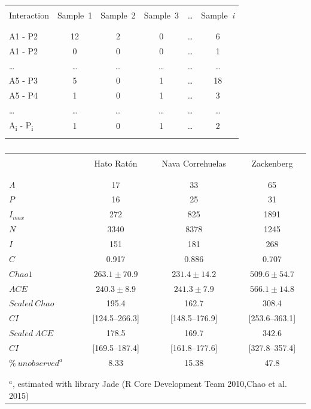 \documentclass[12pt]{article}
\begin{document}
%
\newpage
\begin{table}[h!]
  \caption{}
  \label{TabENFA}
  \begin{center}
    \begin{tabular}{lccccc}
      \hline
\\Interaction&Sample\ 1&Sample\ 2&Sample\ 3&{\ldots}&Sample\ \emph{i}\\\\
      \hline
\\A1 - P2&12&2&0&{\ldots}&6\\
A1 - P2&0&0&0&{\ldots}&1\\
{\ldots}&{\ldots}&{\ldots}&{\ldots}&{\ldots}&{\ldots}\\
A5 - P3&5&0&1&{\ldots}&18\\
A5 - P4&1&0&1&{\ldots}&3\\
{\ldots}&{\ldots}&{\ldots}&{\ldots}&{\ldots}&{\ldots}\\
A\textsubscript{i} - P\textsubscript{i}&1&0&1&{\ldots}&2\\\\
      \hline
    \end{tabular}
  \end{center}
\end{table}
%
\newpage
\begin{table}[h!]
  \caption{}
  \label{TabENFA}
  \begin{center}
    \begin{tabular}{lccc}
      \hline
\\       &Hato Rat\'on  &  Nava Correhuelas&    Zackenberg\\\\
      \hline             
\\$A$&17&33&65\\
$P$&16&25&31\\
$I_{max}$&272&825&1891\\
$N$&3340&8378&1245\\
$I$&151&181&268\\
$C$&0.917&0.886&0.707\\
$Chao1$&$263.1\pm70.9$&$231.4\pm14.2$&$509.6\pm54.7$\\
$ACE$&$240.3\pm8.9$&$241.3\pm7.9$&$566.1\pm14.8$\\
$Scaled\ Chao$&195.4&162.7&308.4\\
$CI$&[124.5--266.3]&[148.5--176.9]&[253.6--363.1]\\
$Scaled\ ACE$&178.5&169.7&342.6\\
$CI$&[169.5--187.4]&[161.8--177.6]&[327.8--357.4]\\
$\%\ unobserved^a$&8.33&15.38&47.8\\\\
      \hline
\\\multicolumn{4}{l}{$^a$, estimated with library Jade (R Core Development Team 2010,Chao et al. 2015)}\\
    \end{tabular}
  \end{center}
\end{table}
\newpage
\end{document}
